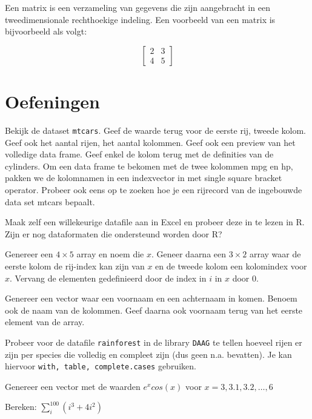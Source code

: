 Een matrix is een verzameling van gegevens die zijn aangebracht in een tweedimensionale rechthoekige indeling. Een voorbeeld van een matrix is bijvoorbeeld als volgt:

\[
\begin{bmatrix}
2 & 3 \\ 
4 & 5  
\end{bmatrix}
\]



\section{Oefeningen}

\begin{exercise}
  Bekijk de dataset \texttt{mtcars}. Geef de waarde terug voor de eerste rij, tweede kolom. Geef ook het aantal rijen, het aantal kolommen. Geef ook een preview van het volledige data frame. Geef enkel de kolom terug met de definities van de cylinders. Om een data frame te bekomen met de twee kolommen mpg en hp, pakken we de kolomnamen in een indexvector in met single square bracket operator. Probeer ook eens op te zoeken hoe je een rijrecord van de ingebouwde data set mtcars bepaalt.
\end{exercise}

\begin{exercise}
  Maak zelf een willekeurige datafile aan in Excel en probeer deze in te lezen in R. Zijn er nog dataformaten die ondersteund worden door R?
\end{exercise}

\begin{exercise}
  Genereer een $4 \times 5$ array en noem die $x$. Geneer daarna een $3 \times 2$ array waar de eerste kolom de rij-index kan zijn van $x$ en de tweede kolom een kolomindex voor $x$. Vervang de elementen gedefinieerd door de index in $i$ in $x$ door 0. 
\end{exercise}

\begin{exercise}
  Genereer een vector waar een voornaam en een achternaam in komen. Benoem ook de naam van de kolommen. Geef daarna ook voornaam terug van het eerste element van de array. 
\end{exercise}

\begin{exercise}
  Probeer voor de datafile \texttt{rainforest} in de library \texttt{DAAG} te tellen hoeveel rijen er zijn per species die volledig en compleet zijn (dus geen n.a. bevatten). Je kan hiervoor \texttt{with, table, complete.cases} gebruiken. 
\end{exercise}

\begin{exercise}
	Genereer een vector met de waarden $e^x cos(x)$ voor $x= 3, 3.1, 3.2, \dots ,6$
\end{exercise}

\begin{exercise}
	Bereken: $\sum_{i}^{100}(i^3 + 4i^2)$
\end{exercise}
